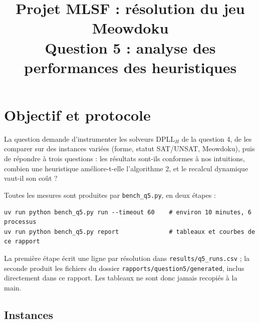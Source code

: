\documentclass[11pt,a4paper]{article}
\title{Projet MLSF : résolution du jeu Meowdoku\\
  \large Question 5 : analyse des performances des heuristiques}
\author{}
\date{}
\begin{document}
\maketitle

\section{Objectif et protocole}

La question demande d'instrumenter les solveurs DPLL$_H$ de la question 4,
de les comparer sur des instances variées (forme, statut SAT/UNSAT,
Meowdoku), puis de répondre à trois questions : les résultats sont-ils
conformes à nos intuitions, combien une heuristique améliore-t-elle
l'algorithme 2, et le recalcul dynamique vaut-il son coût ?

Toutes les mesures sont produites par \texttt{bench\_q5.py}, en deux étapes :
\begin{lstlisting}
uv run python bench_q5.py run --timeout 60    # environ 10 minutes, 6 processus
uv run python bench_q5.py report              # tableaux et courbes de ce rapport
\end{lstlisting}
La première étape écrit une ligne par résolution dans
\texttt{results/q5\_runs.csv} ; la seconde produit les fichiers du dossier
\texttt{rapports/question5/generated}, inclus directement dans ce rapport.
Les tableaux ne sont donc jamais recopiés à la main.

\subsection{Instances}
\end{document}
